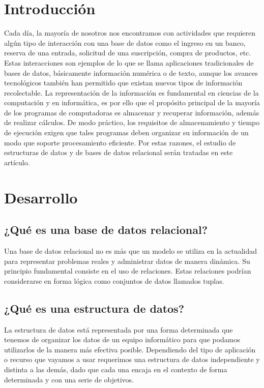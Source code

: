 \documentclass[12pt,letterpaper]{article}
\begin{document}


\section{Introducción}
Cada día, la mayoría de nosotros nos encontramos con actividades que requieren algún tipo de interacción con una base de datos como el ingreso en un banco, reserva de una entrada, solicitud de una suscripción, compra de productos, etc. Estas interacciones son ejemplos de lo que se llama aplicaciones tradicionales de bases de datos, básicamente información numérica o de texto, aunque los avances tecnológicos también han permitido que existan nuevos tipos de información recolectable. La representación de la información es fundamental en ciencias de la computación y en informática, es por ello que el propósito principal de la mayoría de los programas de computadoras es almacenar y recuperar información, además de realizar cálculos. De modo práctico, los requisitos de almacenamiento y tiempo de ejecución exigen que tales programas deben organizar su información de un modo que soporte procesamiento eficiente.
Por estas razones, el estudio de estructuras de datos y de bases de datos relacional serán tratadas en este artículo. 

\section{Desarrollo}
\subsection{¿Qué es una base de datos relacional?}
Una base de datos relacional no es más que un modelo se utiliza en la actualidad para representar problemas reales y administrar datos de manera dinámica. Su principio fundamental consiste en el uso de  relaciones. Estas relaciones podrían considerarse en forma lógica como conjuntos de datos llamados tuplas.\cite{PEO2019}

\subsection{¿Qué es una estructura de datos?}
La estructura de datos está representada por una forma determinada que tenemos de organizar los datos de un equipo informático para que podamos utilizarlos de la manera más efectiva posible. Dependiendo del tipo de aplicación o recurso que vayamos a usar requerimos una estructura de datos independiente y distinta a las demás, dado que cada una encaja en el contexto de forma determinada y con una serie de objetivos.
\end{document}
